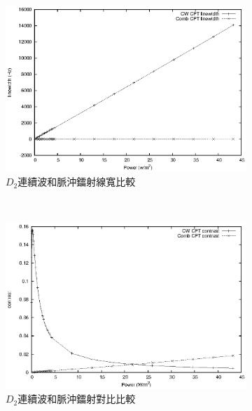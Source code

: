 \documentclass[11pt,a4paper]{article}
\begin{document}
\begin{figure}
\centering
\begin{subfigure}[b]{0.6\textwidth}
\centering
\includegraphics[width=\textwidth]{d2_cw_p/linewidth.eps}
\caption{$D_2$連續波和脈沖鐳射線寬比較}
\label{fig:d2linewidth}
\end{subfigure}\\
\begin{subfigure}[b]{0.6\textwidth}
\centering
\includegraphics[width=\textwidth]{d2_cw_p/contrast.eps}
\caption{$D_2$連續波和脈沖鐳射對比比較}
\label{fig:d2contrast}
\end{subfigure}\\
\begin{subfigure}[b]{0.6\textwidth}
\centering

\end{subfigure}
\end{figure}
\end{document}
